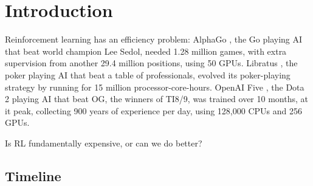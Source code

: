 \chapter{Introduction}\label{C:intro}

Reinforcement learning has an efficiency problem: AlphaGo \cite{Silver2016a}, the Go
playing AI that beat world champion Lee Sedol, needed 1.28 million games, with
extra supervision from another 29.4 million positions, using 50 GPUs.
Libratus \cite{Brown2018b}, the poker playing AI that beat a table of professionals,
evolved its poker-playing strategy by running for 15 million processor-core-hours.
OpenAI Five \cite{Berner2019}, the Dota 2 playing AI that beat OG, the winners of TI8/9, was
trained over 10 months, at it peak, collecting 900 years of experience per day, using
128,000 CPUs and 256 GPUs.

Is RL fundamentally expensive, or can we do better?





%

\section{Timeline}

